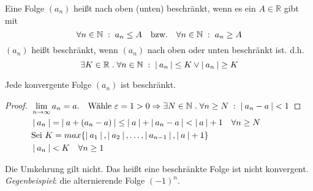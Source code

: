\documentclass[a4paper,titlepage,oneside]{article}
\def\N{\ensuremath{\mathbb{N}} }
\def\R{\ensuremath{\mathbb{R}} }
\renewcommand{\epsilon}{\ensuremath{\varepsilon} }
\def\lor{\ensuremath{\vee}}
\def\sp{\hspace{0,1cm}}
\def\spdot{\sp.\sp}
\def\spcolon{\sp:\sp}
\renewcommand{\liminf}[2][n]{\ensuremath{\lim\limits_{#1 \rightarrow \infty}{#2}}}
\newcommand{\abs}[1]{\ensuremath{\left|\:#1\:\right|}}
\theoremstyle{thmstyle}
\begin{document}
\begin{subdefi}
Eine Folge \((a_n)\) heißt nach oben (unten) beschränkt, wenn es ein \(A \in \R\) gibt mit \[\forall n \in \N \spcolon a_n \le A \quad \text{bzw.} \quad \forall n \in \N \spcolon a_n \ge A\]
\((a_n)\) heißt beschränkt, wenn \((a_n)\) nach oben oder unten beschränkt ist. d.h. \[\exists K \in \R \spdot \forall n \in \N \spcolon \abs{a_n} \le K \lor \abs{a_n} \ge K \]
\end{subdefi}

\begin{subsatz}
Jede konvergente Folge \((a_n)\) ist beschränkt.
\begin{proof}
\begin{math} \displaystyle
\begin{aligned}[t]
	&\liminf{a_n} = a. \quad \text{Wähle } \epsilon = 1 > 0 \Rightarrow \exists N \in \N \spdot \forall n \ge N \spcolon \abs{a_n - a} < 1 \\
	&\abs{a_n} = \abs{a + (a_n - a)} \le \abs{a} + \abs{a_n- a} < \abs{a} + 1 \quad \forall n \ge N \\
	&\text{Sei } K = max\{\abs{a_1}, \abs{a_2}, \dots, \abs{a_{n-1}}, \abs{a}+1\} \\
	&\abs{a_n} < K \quad \forall n \ge 1 \\
\end{aligned}
\end{math}
\end{proof}
\end{subsatz}

\begin{subbem}
Die Umkehrung gilt nicht. Das heißt eine beschränkte Folge ist nicht konvergent.\\
\textit{Gegenbeispiel}: die alternierende Folge $(-1)^n$.
\end{subbem}
\end{document}
